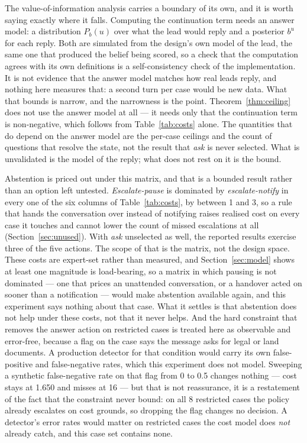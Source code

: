 \documentclass{article}
\begin{document}
The value-of-information analysis carries a boundary of its own, and it is worth
saying exactly where it falls. Computing the continuation term needs an answer
model: a distribution $P_b(u)$ over what the lead would reply and a posterior
$b^u$ for each reply. Both are simulated from the design's own model of the lead,
the same one that produced the belief being scored, so a check that the
computation agrees with its own definitions is a self-consistency check of the
implementation. It is not evidence that the answer model matches how real leads
reply, and nothing here measures that: a second turn per case would be new data.
What that bounds is narrow, and the narrowness is the point.
Theorem~\ref{thm:ceiling} does not use the answer model at all --- it needs only
that the continuation term is non-negative, which follows from
Table~\ref{tab:costs} alone. The quantities that do depend on the answer model are
the per-case ceilings and the count of questions that resolve the state, not the
result that \emph{ask} is never selected. What is unvalidated is the model of the
reply; what does not rest on it is the bound.

Abstention is priced out under this matrix, and that is a bounded result rather
than an option left untested. \emph{Escalate-pause} is dominated by
\emph{escalate-notify} in every one of the six columns of Table~\ref{tab:costs},
by between 1 and 3, so a rule that hands the conversation over instead of
notifying raises realised cost on every case it touches and cannot lower the count
of missed escalations at all (Section~\ref{sec:unused}). With \emph{ask}
unselected as well, the reported results exercise three of the five actions. The
scope of that is the matrix, not the design space. These costs are expert-set
rather than measured, and Section~\ref{sec:model} shows at least one magnitude is
load-bearing, so a matrix in which pausing is not dominated --- one that prices an
unattended conversation, or a handover acted on sooner than a notification ---
would make abstention available again, and this experiment says nothing about that
case. What it settles is that abstention does not help under these costs, not that
it never helps. And the hard constraint that removes
the answer action on restricted cases is treated here as observable and
error-free, because a flag on the case says the message asks for legal or land
documents. A production detector for that condition
would carry its own false-positive and false-negative rates, which this experiment
does not model. Sweeping a synthetic false-negative rate on that flag from 0 to 0.5
changes nothing --- cost stays at 1.650 and misses at 16 --- but that is not
reassurance, it is a restatement of the fact that the constraint never bound: on all
8 restricted cases the policy already escalates on cost grounds, so dropping the flag
changes no decision. A detector's error rates would matter on restricted cases the
cost model does \emph{not} already catch, and this case set contains none.
\end{document}
